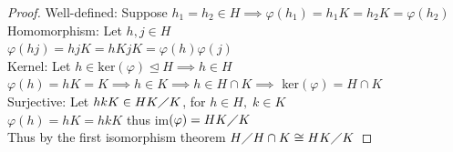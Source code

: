 \documentclass[12pt, letterpaper]{article}
\theoremstyle{definition}
\begin{document}
\begin{itemize}
\begin{proof}
        Well-defined: Suppose $h_1 = h_2 \in H \implies \varphi(h_1)=h_1K=h_2K=\varphi(h_2)$\\
        Homomorphism: Let $h,j \in H$\\
        $\varphi(hj)=hjK=hKjK=\varphi(h)\varphi(j)$\\
        Kernel: Let $h \in \text{ker}(\varphi) \unlhd H \implies h \in H$\\
        $\varphi(h)=hK=K \implies h \in K \implies h \in H \cap K \implies$ ker$(\varphi)=H \cap K$\\
        Surjective: Let $hkK \in HK \diagup K$, for $h \in H,\; k\in K$\\
        $\varphi(h)=hK=hkK$ thus im$(\varphi)=HK \diagup K$\\
        Thus by the first isomorphism theorem $H \diagup H \cap K \cong HK \diagup K$
    \end{proof}
\end{itemize}

\newpage
\end{document}
